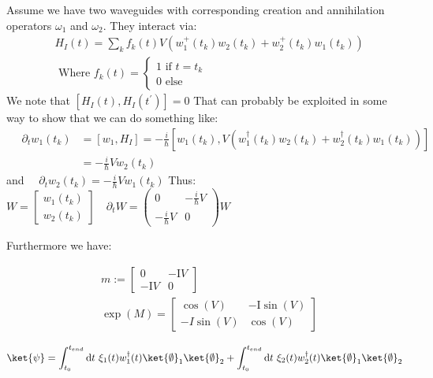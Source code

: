 Assume we have two waveguides with corresponding creation and annihilation operators $\omega_1$ and $\omega_2$. They interact via:
$$
\begin{aligned}
& H_I(t)=\sum_k f_k(t) V\left(w_1^{+}\left(t_k\right) w_2\left(t_k\right)+w_2^{+}\left(t_k\right) w_1\left(t_k\right)\right) \\
& \text { Where } f_k(t)= \begin{cases}1 \text { if } t=t_k \\
0 \text { else }\end{cases}
\end{aligned}
$$
We note that $\left[H_I(t), H_I\left(t^{\prime}\right)\right]=0$
That can probably be exploited in some way to show that we can do something like:
$$
\begin{aligned}
\quad \partial_t w_1\left(t_k\right) & = [ w_1,H_I ] = -\frac{i}{\hbar}\left[w_1\left(t_k\right), V\left(w_1^{\dagger}\left(t_k\right) w_2(t_k)+w_2^{\dagger}\left(t_k\right) w_1\left(t_k\right)\right)\right] \\
& =-\frac{i}{\hbar} V w_2\left(t_k\right)
\end{aligned}
$$
and $\quad \partial_t w_2\left(t_k\right)=-\frac{i}{\hbar} V w_1\left(t_k\right)$
Thus: $W=\left[\begin{array}{l}w_1\left(t_k\right) \\ w_2\left(t_k\right)\end{array}\right] \quad \partial_t W=\left(\begin{array}{cc}0 & -\frac{i}{\hbar} V \\ -\frac{i}{\hbar} V & 0\end{array}\right) W$

Furthermore we have:

$$
\begin{aligned}
&m:=\left[\begin{array}{cc}
0 & -\mathrm{I} V \\
-\mathrm{I} V & 0
\end{array}\right]\\
&\exp( M)=\left[\begin{array}{cc}
\cos (V) & -\mathrm{I} \sin (V) \\
-I \sin (V) & \cos (V)
\end{array}\right]
\end{aligned}
$$


\begin{equation}
    \ket{\psi} = \int_{t_0}^{t_{end}} \mathrm{d}t \ \xi_1(t) w_1^\dagger(t) \ket{\emptyset}_1\ket{\emptyset}_2 + \int_{t_0}^{t_{end}} \mathrm{d}t \ \xi_2(t) w_2^\dagger(t) \ket{\emptyset}_1\ket{\emptyset}_2
\end{equation}

